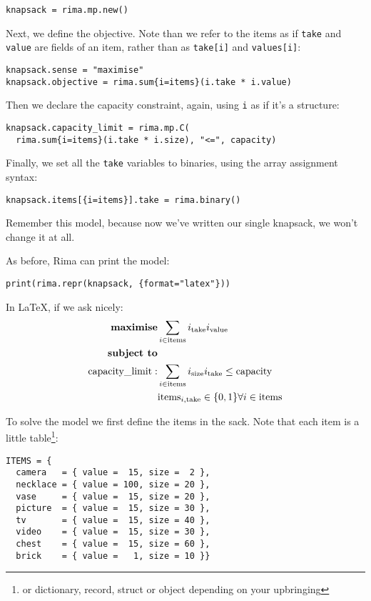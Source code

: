 \documentclass[a4paper,12pt]{article}
\begin{document}
  \begin{lstlisting}
knapsack = rima.mp.new()
  \end{lstlisting}
 
Next, we define the objective.
Note than we refer to the items as if \lstinline!take! and \lstinline!value!
are fields of an item,
rather than as \lstinline!take[i]! and \lstinline!values[i]!:
  \begin{lstlisting}
knapsack.sense = "maximise"
knapsack.objective = rima.sum{i=items}(i.take * i.value)
  \end{lstlisting}

Then we declare the capacity constraint,
again, using \lstinline!i! as if it's a structure:
  \begin{lstlisting}
knapsack.capacity_limit = rima.mp.C(
  rima.sum{i=items}(i.take * i.size), "<=", capacity)
  \end{lstlisting}

Finally, we set all the \lstinline!take! variables to binaries,
using the array assignment syntax:
  \begin{lstlisting}
knapsack.items[{i=items}].take = rima.binary()
  \end{lstlisting}

Remember this model,
because now we've written our single knapsack,
we won't change it at all.

As before, Rima can print the model:
  \begin{lstlisting}
print(rima.repr(knapsack, {format="latex"}))
  \end{lstlisting}

In \LaTeX, if we ask nicely:
\begin{align*}
\text{\bf maximise} & \sum_{i \in \text{items}} i_{\text{take}} i_{\text{value}} \\
\text{\bf subject to} \\
\text{capacity\_limit}: & \sum_{i \in \text{items}} i_{\text{size}} i_{\text{take}} \leq \text{capacity} \\
& \text{items}_{i,\text{take}} \in \{0, 1\} \forall i \in \text{items}\\
\end{align*}

To solve the model we first define the items in the sack.
Note that each item is a little table\footnote{or dictionary, record, struct or object depending on your upbringing}:

  \begin{lstlisting}
ITEMS = {
  camera   = { value =  15, size =  2 },
  necklace = { value = 100, size = 20 },
  vase     = { value =  15, size = 20 },
  picture  = { value =  15, size = 30 },
  tv       = { value =  15, size = 40 },
  video    = { value =  15, size = 30 },
  chest    = { value =  15, size = 60 },
  brick    = { value =   1, size = 10 }}
  \end{lstlisting}
\end{document}
